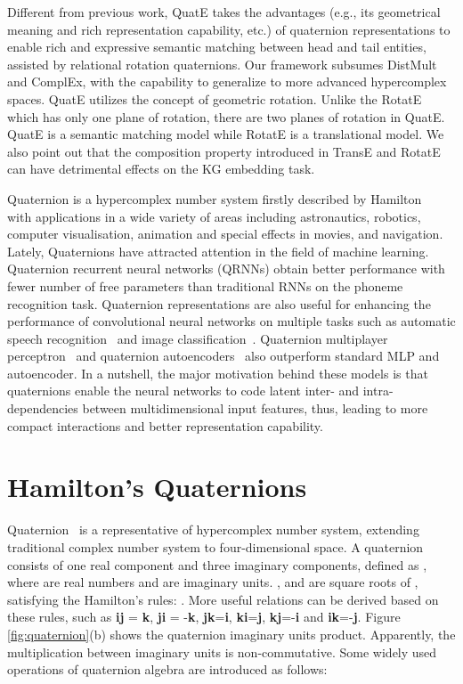 \documentclass{article}
\begin{document}
Different from previous work, QuatE takes the advantages (e.g., its geometrical meaning and rich representation capability, etc.) of quaternion representations to enable rich and expressive semantic matching between head and tail entities, assisted by relational rotation quaternions.  Our framework subsumes DistMult and ComplEx, with the capability to generalize to more advanced hypercomplex spaces. QuatE utilizes the concept of geometric rotation. Unlike the RotatE which has only one plane of rotation, there are two planes of rotation in QuatE. QuatE is a semantic matching model while RotatE is a translational model. We also point out that the composition property introduced in TransE and RotatE can have detrimental effects on the KG embedding task.

Quaternion is a hypercomplex number system firstly described by Hamilton~\citep{hamilton1844lxxviii} with applications in a wide variety of areas including astronautics, robotics, computer visualisation, animation and special effects in movies, and navigation. Lately, Quaternions have attracted attention in the field of machine learning. Quaternion recurrent neural networks (QRNNs) obtain better performance with fewer number of free parameters than traditional RNNs on the phoneme recognition task. Quaternion representations are also useful for enhancing the performance of convolutional neural networks on multiple tasks such as automatic speech recognition~\citep{parcollet2018quaternion2} and image classification~\citep{gaudet2018deep,DBLP:journals/corr/abs-1811-02656}. Quaternion multiplayer perceptron~\citep{7846290} and quaternion autoencoders~\citep{Parcollet2017QuaternionDE} also outperform standard MLP and autoencoder. In a nutshell, the major motivation behind these models is that quaternions enable the neural networks to code latent inter- and intra-dependencies between multidimensional input features, thus, leading to more compact interactions and better representation capability.

\section{Hamilton's Quaternions}
Quaternion~\citep{hamilton1844lxxviii} is a representative of hypercomplex number system, extending traditional complex number system to four-dimensional space. A quaternion  consists of one real component and three imaginary components, defined as , where  are real numbers and  are imaginary units. ,  and  are square roots of , satisfying the Hamilton's rules: . More useful relations can be derived based on these rules, such as \textbf{i}\textbf{j} = \textbf{k}, \textbf{j}\textbf{i} = -\textbf{k}, \textbf{j}\textbf{k}=\textbf{i}, \textbf{k}\textbf{i}=\textbf{j}, \textbf{k}\textbf{j}=-\textbf{i} and \textbf{i}\textbf{k}=-\textbf{j}. Figure \ref{fig:quaternion}(b) shows the quaternion imaginary units product. Apparently, the multiplication between imaginary units is non-commutative. Some widely used operations of quaternion algebra  are introduced as follows:
\end{document}
